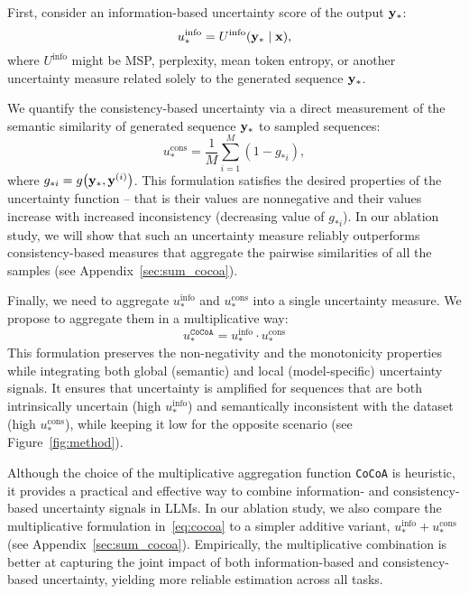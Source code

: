   First, consider an information-based uncertainty score of the output $\mathbf{y}_*$:
  \begin{equation}
    u_*^{\text{info}} = U^{\text{info}}(\mathbf{y}_* \mid \mathbf{x}),
  \end{equation}
  where $U^{\text{info}}$ might be MSP, perplexity, mean token entropy, or another uncertainty measure related solely to the generated sequence $\mathbf{y}_*$. 

  We quantify the consistency-based uncertainty via a direct measurement of the semantic similarity of generated sequence $\mathbf{y}_*$ to sampled sequences:
  \begin{equation}
    u_*^{\text{cons}} = \frac{1}{M} \sum_{i = 1}^M (1 - g_{*i}),
    \label{eq:ave_dissim}
  \end{equation}
  where $g_{*i} = g\bigl(\mathbf{y}_*, \mathbf{y}^{(i)}\bigr)$. This formulation satisfies the desired properties of the uncertainty function -- that is their values are nonnegative and their values increase with increased inconsistency (decreasing value of $g_{*i}$). In our ablation study, we will show that such an uncertainty measure reliably outperforms consistency-based measures that aggregate the pairwise similarities of all the samples (see Appendix~\ref{sec:sum_cocoa}).

  Finally, we need to aggregate $u_*^{\text{info}}$ and $u_*^{\text{cons}}$ into a single uncertainty measure. We propose to aggregate them in a multiplicative way:
  \begin{equation}
    u_*^{\texttt{CoCoA}} = u_*^{\text{info}} \cdot u_*^{\text{cons}}
  \label{eq:cocoa}
  \end{equation}
  This formulation preserves the non-negativity and the monotonicity properties while integrating both global (semantic) and local (model-specific) uncertainty signals. It ensures that uncertainty is amplified for sequences that are both intrinsically uncertain (high \(u_*^{\text{info}}\)) and semantically inconsistent with the dataset (high \(u_*^{\text{cons}}\)), while keeping it low for the opposite scenario (see Figure~\ref{fig:method}).

  Although the choice of the multiplicative aggregation function \texttt{CoCoA} is heuristic, it provides a practical and effective way to combine information- and consistency-based uncertainty signals in LLMs. In our ablation study, we also compare the multiplicative formulation in~\eqref{eq:cocoa} to a simpler additive variant, \(u_*^{\text{info}} + u_*^{\text{cons}}\) (see Appendix~\ref{sec:sum_cocoa}). Empirically, the multiplicative combination is better at capturing the joint impact of both information-based and consistency-based uncertainty, yielding more reliable estimation across all tasks.


